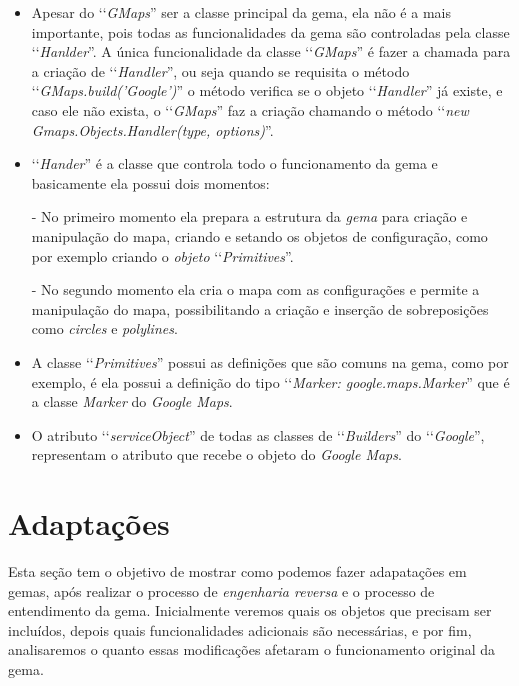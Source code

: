 \begin{itemize}

 \item Apesar do ‘‘\emph{GMaps}'' ser a classe principal da gema, ela não é a mais
 importante, pois todas as funcionalidades da gema são controladas pela classe
 ‘‘\emph{Hanlder}''. A única funcionalidade da classe ‘‘\emph{GMaps}'' é fazer a chamada
 para a criação de ‘‘\emph{Handler}'', ou seja quando se requisita o método 
 ‘‘\emph{GMaps.build('Google')}'' o método verifica se o objeto ‘‘\emph{Handler}'' já
 existe, e caso ele não exista, o ‘‘\emph{GMaps}'' faz a criação chamando o método 
 ‘‘\emph{new Gmaps.Objects.Handler(type, options)}''.

 \item ‘‘\emph{Hander}'' é a classe que controla todo o funcionamento da gema e 
 basicamente ela possui dois momentos:
 
  \subitem - No primeiro momento ela prepara a estrutura da \emph{gema} para criação e manipulação
  do mapa, criando e setando os objetos de configuração, como por exemplo criando o \emph{objeto}
  ‘‘\emph{Primitives}''.
  
  \subitem - No segundo momento ela cria o mapa com as configurações e permite a manipulação do mapa, 
  possibilitando a criação e inserção de sobreposições como \emph{circles} e \emph{polylines}.
 
 \item A classe ‘‘\emph{Primitives}'' possui as definições que são comuns na gema, 
 como por exemplo, é ela possui a definição do tipo ‘‘\emph{Marker: google.maps.Marker}'' que 
 é a classe \emph{Marker} do \emph{Google Maps}.
 
 \item O atributo ‘‘\emph{serviceObject}'' de todas as classes de 
 ‘‘\emph{Builders}'' do ‘‘\emph{Google}'', representam o atributo que recebe o objeto do 
 \emph{Google Maps}.
 
\end{itemize}
 
\section{Adaptações}
\label{section:adaptações}

Esta seção tem o objetivo de mostrar como podemos fazer adapatações em gemas, após realizar o processo de
\emph{engenharia reversa} e o processo de entendimento da gema. Inicialmente veremos quais os objetos que
precisam ser incluídos, depois quais funcionalidades adicionais são necessárias, e por fim, analisaremos o
quanto essas modificações afetaram o funcionamento original da gema.

